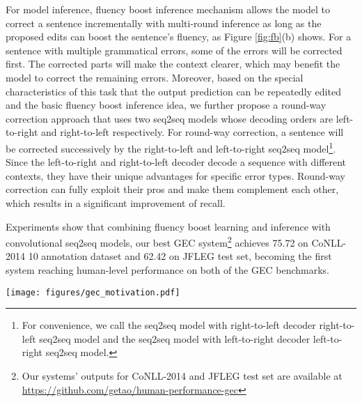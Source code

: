 \documentclass{article} \usepackage{MSRA_TR,times}
\begin{document}
For model inference, fluency boost inference mechanism allows the model to correct a sentence incrementally with multi-round inference as long as the proposed edits can boost the sentence's fluency, as Figure \ref{fig:fb}(b) shows. For a sentence with multiple grammatical errors, some of the errors will be corrected first. The corrected parts will make the context clearer, which may benefit the model to correct the remaining errors. Moreover, based on the special characteristics of this task that the output prediction can be repeatedly edited and the basic fluency boost inference idea, we further propose a round-way correction approach that uses two seq2seq models whose decoding orders are left-to-right and right-to-left respectively. For round-way correction, a sentence will be corrected successively by the right-to-left and left-to-right seq2seq model\footnote{For convenience, we call the seq2seq model with right-to-left decoder right-to-left seq2seq model and the seq2seq model with left-to-right decoder left-to-right seq2seq model.}. Since the left-to-right and right-to-left decoder decode a sequence with different contexts, they have their unique advantages for specific error types. Round-way correction can fully exploit their pros and make them complement each other, which results in a significant improvement of recall.

Experiments show that combining fluency boost learning and inference with convolutional seq2seq models, our best GEC system\footnote{Our systems' outputs for CoNLL-2014 and JFLEG test set are available at \url{https://github.com/getao/human-performance-gec}} achieves 75.72  on CoNLL-2014 10 annotation dataset and 62.42  on JFLEG test set, becoming the first system reaching human-level performance on both of the GEC benchmarks.

\begin{figure*}[t]
\centering
\texttt{[image: figures/gec\_motivation.pdf]}\vspace{-0.5cm}
\caption{Fluency boost learning and inference: \textbf{(a)} given a training instance (i.e., an error-corrected sentence pair), fluency boost learning establishes multiple fluency boost sentence pairs from the seq2seq's n-best outputs during training. The fluency boost sentence pairs will be used as training instances in subsequent training epochs, which helps expand the training set and accordingly benefits model learning; \textbf{(b)} fluency boost inference allows an error correction model to correct a sentence incrementally through multi-round seq2seq inference as long as its fluency can be improved.}\label{fig:fb}
\end{figure*}
\end{document}
